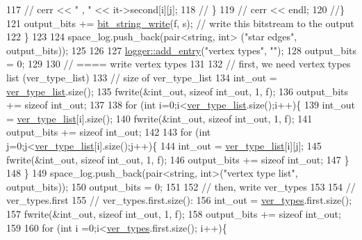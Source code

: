 \begin{DoxyCode}
117     \textcolor{comment}{//    cerr << " , " << it->second[i][j];}
118     \textcolor{comment}{//  \}}
119     \textcolor{comment}{//  cerr << endl;}
120     \textcolor{comment}{//\}}
121     output\_bits += \hyperlink{compression__helper_8cpp_a9a2fbdf1fe0e38f631e7e242a819883b}{bit\_string\_write}(f, s); \textcolor{comment}{// write this bitstream to the output}
122   \}
123 
124   space\_log.push\_back(pair<string, int> (\textcolor{stringliteral}{"star edges"}, output\_bits));
125 
126 
127   \hyperlink{classlogger_a710163deb17bc81f70d53d285b8ac9ac}{logger::add\_entry}(\textcolor{stringliteral}{"vertex types"}, \textcolor{stringliteral}{""});
128   output\_bits = 0;
129 
130   \textcolor{comment}{// ==== write vertex types}
131 
132   \textcolor{comment}{// first, we need vertex types list (ver\_type\_list)}
133   \textcolor{comment}{// size of ver\_type\_list}
134   int\_out = \hyperlink{classmarked__graph__compressed_af2e3e55223d436628a02758dfae88493}{ver\_type\_list}.size();
135   fwrite(&int\_out, \textcolor{keyword}{sizeof} int\_out, 1, f);
136   output\_bits += \textcolor{keyword}{sizeof} int\_out;
137 
138   \textcolor{keywordflow}{for} (\textcolor{keywordtype}{int} i=0;i<\hyperlink{classmarked__graph__compressed_af2e3e55223d436628a02758dfae88493}{ver\_type\_list}.size();i++)\{
139     int\_out = \hyperlink{classmarked__graph__compressed_af2e3e55223d436628a02758dfae88493}{ver\_type\_list}[i].size();
140     fwrite(&int\_out, \textcolor{keyword}{sizeof} int\_out, 1, f);
141     output\_bits += \textcolor{keyword}{sizeof} int\_out;
142 
143     \textcolor{keywordflow}{for} (\textcolor{keywordtype}{int} j=0;j<\hyperlink{classmarked__graph__compressed_af2e3e55223d436628a02758dfae88493}{ver\_type\_list}[i].size();j++)\{
144       int\_out = \hyperlink{classmarked__graph__compressed_af2e3e55223d436628a02758dfae88493}{ver\_type\_list}[i][j];
145       fwrite(&int\_out, \textcolor{keyword}{sizeof} int\_out, 1, f);
146       output\_bits += \textcolor{keyword}{sizeof} int\_out;
147     \}
148   \}
149   space\_log.push\_back(pair<string, int>(\textcolor{stringliteral}{"vertex type list"}, output\_bits));
150   output\_bits = 0;
151   
152   \textcolor{comment}{// then, write ver\_types}
153 
154   \textcolor{comment}{// ver\_types.first}
155   \textcolor{comment}{// ver\_types.first.size():}
156   int\_out = \hyperlink{classmarked__graph__compressed_af446cc5e23c241a92b76642fd5ebc403}{ver\_types}.first.size();
157   fwrite(&int\_out, \textcolor{keyword}{sizeof} int\_out, 1, f);
158   output\_bits += \textcolor{keyword}{sizeof} int\_out;
159 
160   \textcolor{keywordflow}{for} (\textcolor{keywordtype}{int} i =0;i<\hyperlink{classmarked__graph__compressed_af446cc5e23c241a92b76642fd5ebc403}{ver\_types}.first.size(); i++)\{

\end{DoxyCode}
